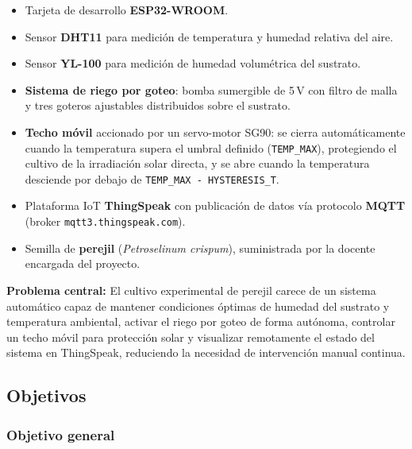 \begin{itemize}
    \item Tarjeta de desarrollo \textbf{ESP32-WROOM}.

    \item Sensor \textbf{DHT11} para medición de temperatura y humedad relativa del aire.

    \item Sensor \textbf{YL-100} para medición de humedad volumétrica del sustrato.

    \item \textbf{Sistema de riego por goteo}: bomba sumergible de 5\,V con filtro de malla y tres goteros ajustables distribuidos sobre el sustrato.

    \item \textbf{Techo móvil} accionado por un servo-motor SG90: se cierra automáticamente cuando la temperatura supera el umbral definido (\texttt{TEMP\_MAX}), protegiendo el cultivo de la irradiación solar directa, y se abre cuando la temperatura desciende por debajo de \texttt{TEMP\_MAX\,-\,HYSTERESIS\_T}.

    \item Plataforma IoT \textbf{ThingSpeak} con publicación de datos vía protocolo \textbf{MQTT} (broker \texttt{mqtt3.thingspeak.com}).

    \item Semilla de \textbf{perejil} (\textit{Petroselinum crispum}), suministrada por la docente encargada del proyecto.
\end{itemize}

\noindent\textbf{Problema central:} El cultivo experimental de perejil carece de un sistema automático capaz de mantener condiciones óptimas de humedad del sustrato y temperatura ambiental, activar el riego por goteo de forma autónoma, controlar un techo móvil para protección solar y visualizar remotamente el estado del sistema en ThingSpeak, reduciendo la necesidad de intervención manual continua.

\subsection{Objetivos}

\subsubsection{Objetivo general}

